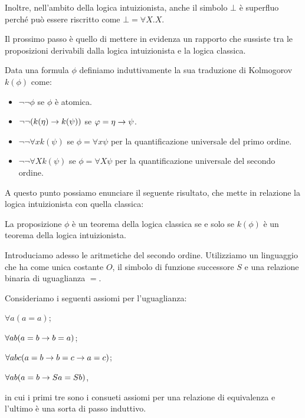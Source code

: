 \documentclass[]{marticle}
\begin{document}
Inoltre, nell'ambito della logica intuizionista, anche il simbolo $\bot$ \`e
superfluo perch\'e pu\`o essere riscritto come $\bot = \forall X.X$.


Il prossimo passo \`e quello di mettere in evidenza un rapporto che sussiste tra
le proposizioni derivabili dalla logica intuizionista e la logica classica.
\begin{block}[Definizione]
    Data una formula $\phi$ definiamo induttivamente la sua traduzione di
    Kolmogorov $k(\phi)$ come:
    \begin{itemize}
        \item $\lnot\lnot \phi$ se $\phi$ \`e atomica.
        \item $\lnot\lnot(k(\eta)\rightarrow k(\psi))$ se $\varphi=\eta\rightarrow\psi$.
        \item $\lnot\lnot \forall x k(\psi)$ se $\phi = \forall x \psi$ per la
            quantificazione universale del primo ordine.
        \item $\lnot\lnot \forall X k(\psi)$ se $\phi = \forall X \psi$ per la
            quantificazione universale del secondo ordine.
    \end{itemize}
\end{block}

A questo punto possiamo enunciare il seguente risultato, che mette in relazione
la logica intuizionista con quella classica:
\begin{block}[Proposizione]
    La proposizione $\phi$ \`e un teorema della logica classica se e solo se
    $k(\phi)$ \`e un teorema della logica intuizionista.
\end{block}

Introduciamo adesso le aritmetiche del secondo ordine. Utilizziamo un linguaggio
che ha come unica costante $O$, il simbolo di funzione successore $S$ e una
relazione binaria di uguaglianza $=$.

Consideriamo i seguenti assiomi per l'uguaglianza:
\begin{nlist}[U1]
    \item $\forall a (a=a)$;
    \item $\forall ab (a=b\rightarrow b=a)$;
    \item $\forall abc (a=b \rightarrow b=c \rightarrow a=c)$;
    \item $\forall ab(a=b \rightarrow Sa = Sb)$,
\end{nlist}
in cui i primi tre sono i consueti assiomi per una relazione di equivalenza e
l'ultimo \`e una sorta di passo induttivo.
\end{document}
